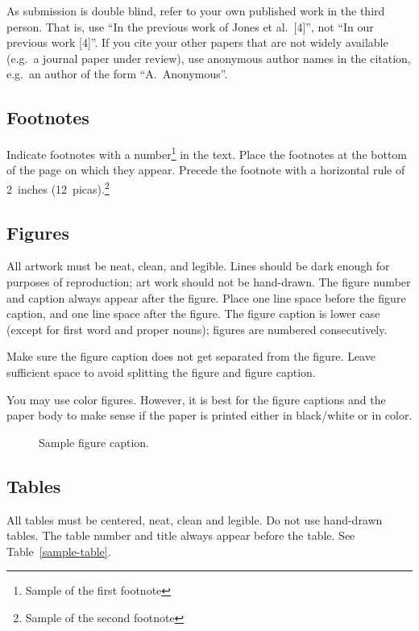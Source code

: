 \documentclass{article} %
\begin{document}
As submission is double blind, refer to your own published work in the 
third person. That is, use ``In the previous work of Jones et al.\ [4]'',
not ``In our previous work [4]''. If you cite your other papers that
are not widely available (e.g.\ a journal paper under review), use
anonymous author names in the citation, e.g.\ an author of the
form ``A.\ Anonymous''. 


\subsection{Footnotes}

Indicate footnotes with a number\footnote{Sample of the first footnote} in the
text. Place the footnotes at the bottom of the page on which they appear.
Precede the footnote with a horizontal rule of 2~inches
(12~picas).\footnote{Sample of the second footnote}

\subsection{Figures}

All artwork must be neat, clean, and legible. Lines should be dark
enough for purposes of reproduction; art work should not be
hand-drawn. The figure number and caption always appear after the
figure. Place one line space before the figure caption, and one line
space after the figure. The figure caption is lower case (except for
first word and proper nouns); figures are numbered consecutively.

Make sure the figure caption does not get separated from the figure.
Leave sufficient space to avoid splitting the figure and figure caption.

You may use color figures. 
However, it is best for the
figure captions and the paper body to make sense if the paper is printed
either in black/white or in color.
\begin{figure}[h]
\begin{center}
\fbox{\rule[-.5cm]{0cm}{4cm} \rule[-.5cm]{4cm}{0cm}}
\end{center}
\caption{Sample figure caption.}
\end{figure}

\subsection{Tables}

All tables must be centered, neat, clean and legible. Do not use hand-drawn
tables. The table number and title always appear before the table. See
Table~\ref{sample-table}.
\end{document}
